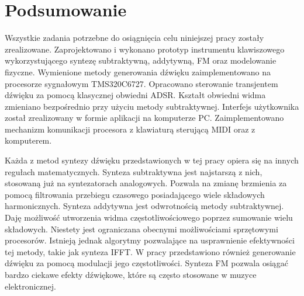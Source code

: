 \chapter{Podsumowanie}
Wszystkie zadania potrzebne do osiągnięcia celu niniejszej pracy zostały zrealizowane. Zaprojektowano i wykonano prototyp instrumentu klawiszowego wykorzystującego syntezę subtraktywną, addytywną, FM oraz modelowanie fizyczne. Wymienione metody generowania dźwięku zaimplementowano na procesorze sygnałowym TMS320C6727. Opracowano sterowanie transjentem dźwięku za pomocą klasycznej obwiedni ADSR. Kształt obwiedni widma zmieniano bezpośrednio przy użyciu metody subtraktywnej. Interfejs użytkownika został zrealizowany w formie aplikacji na komputerze PC. Zaimplementowano mechanizm komunikacji procesora z klawiaturą sterującą MIDI oraz z komputerem. 

Każda z metod syntezy dźwięku przedstawionych w tej pracy opiera się na innych regułach matematycznych. Synteza subtraktywna jest najstarszą z nich, stosowaną już na syntezatorach analogowych. Pozwala na zmianę brzmienia za pomocą filtrowania przebiegu czasowego posiadającego wiele składowych harmonicznych. Synteza addytywna jest odwrotnością metody subtraktywnej. Daję możliwość utworzenia widma częstotliwościowego poprzez sumowanie wielu składowych. Niestety jest ograniczana obecnymi możliwościami sprzętowymi procesorów. Istnieją jednak algorytmy pozwalające na usprawnienie efektywności tej metody, takie jak synteza IFFT. W pracy przedstawiono również generowanie dźwięku za pomocą modulacji jego częstotliwości. Synteza FM pozwala osiągać bardzo ciekawe efekty dźwiękowe, które są często stosowane w muzyce elektronicznej.



